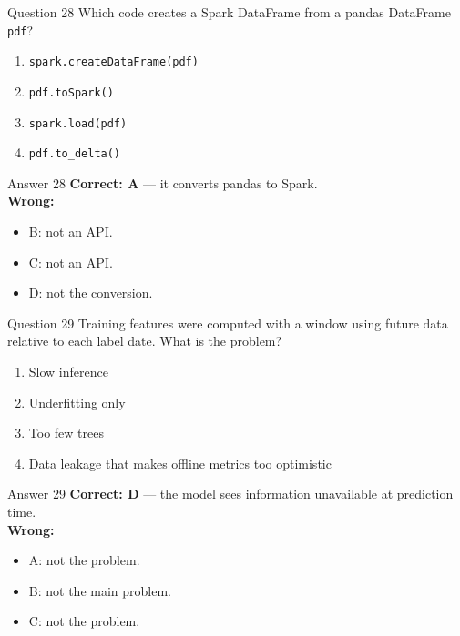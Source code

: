 \documentclass[aspectratio=169,11pt]{beamer}
\begin{document}
\begin{frame}{Question 28}
Which code creates a Spark DataFrame from a pandas DataFrame \texttt{pdf}?
\begin{enumerate}[label=\Alph*.]
\item \texttt{spark.createDataFrame(pdf)}
\item \texttt{pdf.toSpark()}
\item \texttt{spark.load(pdf)}
\item \texttt{pdf.to\_delta()}
\end{enumerate}
\end{frame}
\begin{frame}{Answer 28}
\textbf{Correct: A} --- it converts pandas to Spark.\\
\vspace{0.5em}
\textbf{Wrong:}
\begin{itemize}
\item B: not an API.
\item C: not an API.
\item D: not the conversion.
\end{itemize}
\end{frame}

\begin{frame}{Question 29}
Training features were computed with a window using future data relative to each label date. What is the problem?
\begin{enumerate}[label=\Alph*.]
\item Slow inference
\item Underfitting only
\item Too few trees
\item Data leakage that makes offline metrics too optimistic
\end{enumerate}
\end{frame}
\begin{frame}{Answer 29}
\textbf{Correct: D} --- the model sees information unavailable at prediction time.\\
\vspace{0.5em}
\textbf{Wrong:}
\begin{itemize}
\item A: not the problem.
\item B: not the main problem.
\item C: not the problem.
\end{itemize}
\end{frame}
\end{document}
